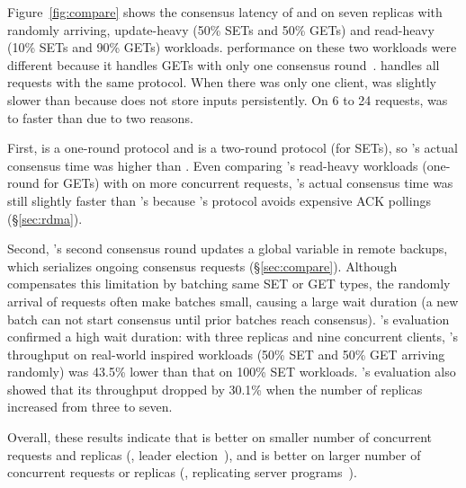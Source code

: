 Figure~\ref{fig:compare} shows the consensus latency of \xxx 
and \dare on seven replicas with randomly arriving, update-heavy (50\% SETs and 
50\% GETs) and read-heavy (10\% SETs and 90\% GETs) workloads. \dare 
performance on these two workloads were different because it handles GETs with 
only one consensus round~\cite{dare:hpdc15}. \xxx handles all requests with the 
same protocol. When there was only one client, \xxx was slightly slower than 
\dare because \dare does not store inputs persistently. On 6 to 24 requests, 
\xxx was \fasterDARElow to \fasterDAREhigh faster than \dare due to two reasons.

First, \xxx is a one-round protocol and \dare is a two-round protocol (for 
SETs), so \dare's actual consensus time was \fasterDAREconsensusonly higher than 
\xxx. Even comparing \dare's read-heavy workloads (one-round for GETs) with 
\xxx on more concurrent requests, \xxx's actual consensus time was still 
slightly faster than \dare's because \xxx's protocol avoids expensive ACK 
pollings (\S\ref{sec:rdma}).

Second, \dare's second consensus round updates a global variable in remote 
backups, which serializes ongoing consensus requests (\S\ref{sec:compare}). 
Although \dare compensates this limitation by batching same SET or GET types, 
the randomly arrival of requests often make batches small, causing a large 
wait duration (a new batch can not start consensus until prior batches 
reach consensus). \dare's evaluation~\cite{dare:hpdc15} confirmed a high 
wait duration: with three replicas and nine concurrent clients, \dare's 
throughput on real-world inspired workloads (50\% SET and 50\% GET arriving 
randomly) was 43.5\% lower than that on 100\% SET workloads. \dare's 
evaluation also showed that its throughput dropped by 30.1\% when the number of 
replicas increased from three to seven.

Overall, these results indicate that \dare is better on smaller number of 
concurrent requests and replicas (\eg, 
leader election~\cite{chubby:osdi,zookeeper}), and \xxx is better on larger 
number of concurrent requests or replicas (\eg, replicating server 
programs~\cite{rex:eurosys14,crane:sosp15}).


